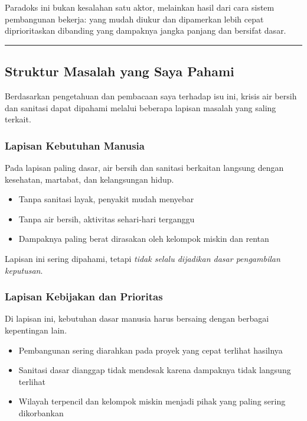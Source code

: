 \documentclass[
  letterpaper,
  DIV=11,
  numbers=noendperiod]{scrreprt}
\providecommand{\tightlist}{%
  \setlength{\itemsep}{0pt}\setlength{\parskip}{0pt}}
\begin{document}
Paradoks ini bukan kesalahan satu aktor, melainkan hasil dari cara
sistem pembangunan bekerja: yang mudah diukur dan dipamerkan lebih cepat
diprioritaskan dibanding yang dampaknya jangka panjang dan bersifat
dasar.

\begin{center}\rule{0.5\linewidth}{0.5pt}\end{center}

\subsection{Struktur Masalah yang Saya
Pahami}\label{struktur-masalah-yang-saya-pahami}

Berdasarkan pengetahuan dan pembacaan saya terhadap isu ini, krisis air
bersih dan sanitasi dapat dipahami melalui beberapa lapisan masalah yang
saling terkait.

\subsubsection{Lapisan Kebutuhan
Manusia}\label{lapisan-kebutuhan-manusia}

Pada lapisan paling dasar, air bersih dan sanitasi berkaitan langsung
dengan kesehatan, martabat, dan kelangsungan hidup.

\begin{itemize}
\tightlist
\item
  Tanpa sanitasi layak, penyakit mudah menyebar
\item
  Tanpa air bersih, aktivitas sehari-hari terganggu
\item
  Dampaknya paling berat dirasakan oleh kelompok miskin dan rentan
\end{itemize}

Lapisan ini sering dipahami, tetapi \emph{tidak selalu dijadikan dasar
pengambilan keputusan}.

\subsubsection{Lapisan Kebijakan dan
Prioritas}\label{lapisan-kebijakan-dan-prioritas}

Di lapisan ini, kebutuhan dasar manusia harus bersaing dengan berbagai
kepentingan lain.

\begin{itemize}
\tightlist
\item
  Pembangunan sering diarahkan pada proyek yang cepat terlihat hasilnya
\item
  Sanitasi dasar dianggap tidak mendesak karena dampaknya tidak langsung
  terlihat
\item
  Wilayah terpencil dan kelompok miskin menjadi pihak yang paling sering
  dikorbankan
\end{itemize}
\end{document}
